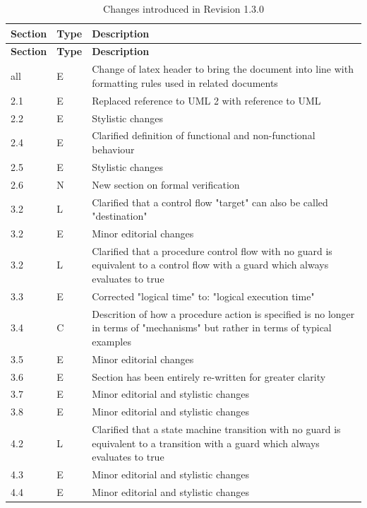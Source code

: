 \documentclass[a4paper,10pt]{article}
\begin{document}
\begin{longtable}{|p{1.5cm}|p{1cm}|p{8cm}|}
\caption{Changes introduced in Revision 1.3.0}  \\
\hline
\rowcolor{light-gray}
\textbf{Section} & \textbf{Type} & \textbf{Description} \\
\hline\hline
\endfirsthead
\rowcolor{light-gray}
\textbf{Section} & \textbf{Type} & \textbf{Description} \\
\hline\hline
\endhead
all  & E & Change of latex header to bring the document into line with formatting rules used in related documents\\
\hline
2.1  & E & Replaced reference to UML 2 with reference to UML\\
\hline
2.2  & E & Stylistic changes\\
\hline
2.4  & E & Clarified definition of functional and non-functional behaviour\\
\hline
2.5  & E & Stylistic changes\\
\hline
2.6  & N & New section on formal verification\\
\hline
3.2  & L & Clarified that a control flow "target" can also be called "destination"\\
\hline
3.2  & E & Minor editorial changes \\
\hline
3.2  & L & Clarified that a procedure control flow with no guard is equivalent to a control flow with a guard which always evaluates to true\\
\hline
3.3  & E & Corrected "logical time" to: "logical execution time"\\
\hline
3.4  & C & Descrition of how a procedure action is specified is no longer in terms of "mechanisms" but rather in terms of typical examples\\
\hline
3.5  & E & Minor editorial changes \\
\hline
3.6  & E & Section has been entirely re-written for greater clarity\\
\hline
3.7  & E & Minor editorial and stylistic changes \\
\hline
3.8  & E & Minor editorial and stylistic changes \\
\hline
4.2  & L & Clarified that a state machine transition with no guard is equivalent to a transition with a guard which always evaluates to true\\
\hline
4.3  & E & Minor editorial and stylistic changes \\
\hline
4.4  & E & Minor editorial and stylistic changes \\

\end{longtable}
\end{document}
